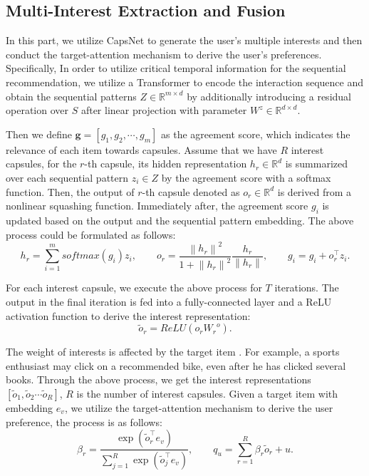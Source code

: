 \documentclass[runningheads]{llncs}
\begin{document}
\vspace{-10pt}
\subsection{Multi-Interest Extraction and Fusion}

In this part, we utilize CapsNet \cite{capsulenet} to generate the user’s multiple interests and then conduct the target-attention mechanism to derive the user’s preferences. 
Specifically, In order to utilize critical temporal information for the sequential recommendation, we utilize a Transformer to encode the interaction sequence and obtain the sequential patterns $Z \in \mathbb{R}^{m \times d}$ by additionally introducing a residual operation over $S$ after linear projection with parameter $W^{z} \in \mathbb{R}^{d \times d}$.

Then we define $\textbf{g}=[g_1,g_2,\cdots,g_m]$ as the agreement score, which indicates the relevance of each item towards capsules. Assume that we have $R$ interest capsules, for the $r$-th capsule, its hidden representation $h_r \in \mathbb{R}^{d}$ is summarized over each sequential pattern $z_i \in Z$ by the agreement score with a softmax function. Then, the output of $r$-th capsule denoted as $o_r \in \mathbb{R}^{d}$ is derived from a nonlinear squashing function. 
Immediately after, the agreement score $g_i$ is updated based on the output and the sequential pattern embedding. The above process could be formulated as follows:
\begin{equation}
{h}_{r}=\sum_{i=1}^{m} softmax(g_{i}) {z}_{i},\qquad  o_{r}= \frac{\left\|{h}_{r}\right\|^{2}}{1+\left\|{h}_{r}\right\|^{2}} \frac{{h}_{r}}{\left\|{h}_{r}\right\|},\qquad  
g_{i}=g_{i}+{o}_{r}^{\top} {z}_{i}.
\end{equation}

For each interest capsule, we execute the above process for \(T\) iterations. The output in the final iteration is fed into a fully-connected layer and a ReLU activation function to derive the interest representation:
\begin{equation}
\tilde{o}_{r}={ReLU}\left({o}_{r} {W_r}^{o}\right).
\end{equation}


The weight of interests is affected by the target item \cite{ta}. For example, a sports enthusiast may click on a recommended bike, even after he has clicked several books. Through the above process, we get the interest representations \([\tilde{o}_1 , \tilde{o}_2 \cdots \tilde{o}_R]\), \(R\) is the number of interest capsules.
Given a target item with embedding \(e_{v}\), we  utilize the target-attention mechanism to derive the user preference, the process is as follows:
\begin{equation}
\beta_{r}=\frac{\exp \left(\tilde{o}_{r}^{\top} {e}_{v}\right)}{\sum_{j=1}^{R} \exp \left({\tilde{o}}_{j}^{\top}{e}_{v}\right)}, \qquad  {q}_{u}=\sum_{r=1}^{R} \beta_{r} {\tilde{o}}_{r} + u.
\end{equation}
\end{document}
